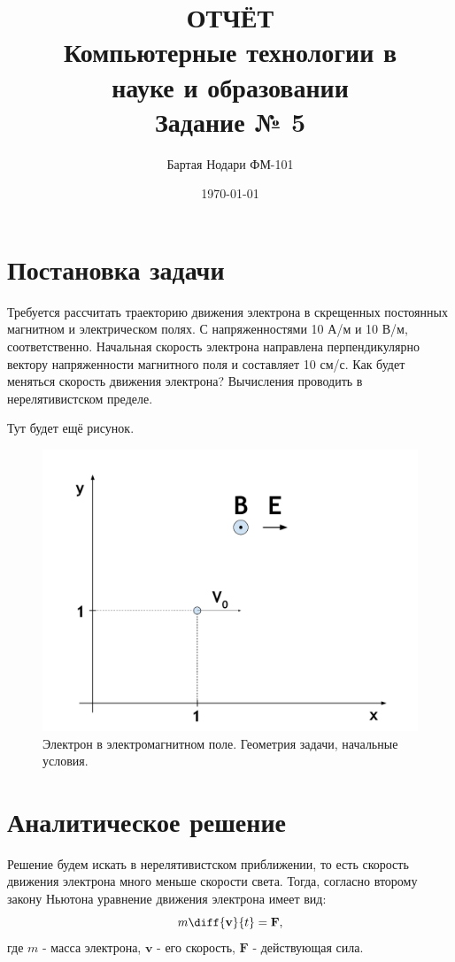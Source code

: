 \documentclass[a4paper]{article}
\author{Бартая Нодари ФМ-101}
\title{ОТЧЁТ\\ Компьютерные технологии в\\ науке и образовании\\ Задание № 5}
\date{\today}
\begin{document}
\maketitle
\section{Постановка задачи}

Требуется рассчитать траекторию движения электрона в скрещенных
постоянных магнитном и электрическом полях. 
С напряженностями 10 А/м и 10 В/м, соответственно. 
Начальная скорость электрона направлена перпендикулярно вектору напряженности магнитного поля и составляет 10 см/с. 
Как будет меняться скорость движения электрона? 
Вычисления проводить в нерелятивистском пределе.

Тут будет ещё рисунок.
\begin{figure}\label{problem}
	\centering
	\includegraphics[width=\linewidth]{problem.pdf}
	\caption{Электрон в электромагнитном поле. Геометрия задачи, начальные условия.}
\end{figure}

\section{Аналитическое решение}
Решение будем искать в нерелятивистском приближении, то есть скорость движения электрона много меньше скорости света. Тогда, согласно второму закону Ньютона уравнение движения электрона имеет вид:
\begin{equation}\label{motion}
m\diff{\mathbf{v}}{t} = \mathbf{F},
\end{equation}
где $m$ - масса электрона, $\mathbf{v}$ - его скорость, $\mathbf{F}$ - действующая сила.
\end{document}
